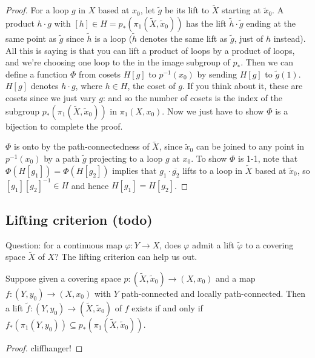 \begin{proof}
    For a loop $g$ in $X$ based at $x_0$, let $\widetilde g$ be its lift to $\widetilde X$ starting at $\widetilde x_0$. A product $h\cdot g$ with $[h]\in H=p_*(\pi_1(\widetilde X,\widetilde x_0))$ has the lift $\widetilde h \cdot \widetilde g$ ending at the same point as $\widetilde g$ since $\widetilde h$ is a loop ($\widetilde h$ denotes the same lift as $\widetilde g$, just of $h$ instead). All this is saying is that you can lift a product of loops by a product of loops, and we're choosing one loop to the in the image subgroup of $p_*$. Then we can define a function $\Phi$ from cosets $H[g]$ to $p ^{-1}(x_0)$ by sending $H[g]$ to $\widetilde g(1)$. $H[g]$ denotes $h\cdot g$, where $h\in H$, the coset of $g$. If you think about it, these are cosets since we just vary $g$: and so the number of cosets is the index of the subgroup $p_*(\pi_1(\widetilde X,\widetilde x_0))$ in $\pi_1(X,x_0)$. Now we just have to show $\Phi$ is a bijection to complete the proof.

    $\Phi$ is onto by the path-connectedness of $\widetilde X$, since $\widetilde x_0$ can be joined to any point in $p ^{-1}(x_0)$ by a path $\widetilde g$ projecting to a loop $g$ at $x_0$. To show $\Phi$ is 1-1, note that $\Phi(H[g_1])=\Phi(H[g_2])$ implies that $g_1\cdot \overline{g_2}$ lifts to a loop in $\widetilde X$ based at $\widetilde x_0$, so $[g_1][g_2]^{-1}\in H$ and hence $H[g_1]=H[g_2]$.
\end{proof}
\subsection{Lifting criterion (todo)}
Question: for a continuous map $\varphi \colon Y \to X$, does $\varphi $ admit a lift $\widetilde \varphi $ to a covering space $\widetilde X$ of $X$? The lifting criterion can help us out.
\begin{theorem}
    Suppose given a covering space $p \colon (\widetilde X,\widetilde x_0) \to (X,x_0)$ and a map $f \colon (Y,y_0) \to (X,x_0)$ with $Y$ path-connected and locally path-connected. Then a lift $\widetilde f \colon (Y,y_0) \to (\widetilde X,\widetilde x_0) $ of $f$ exists if and only if $f_*(\pi_1(Y,y_0))\subseteq p_*(\pi_1(\widetilde X,\widetilde x_0))$.
\end{theorem}
\begin{proof}
    cliffhanger!
\end{proof}






